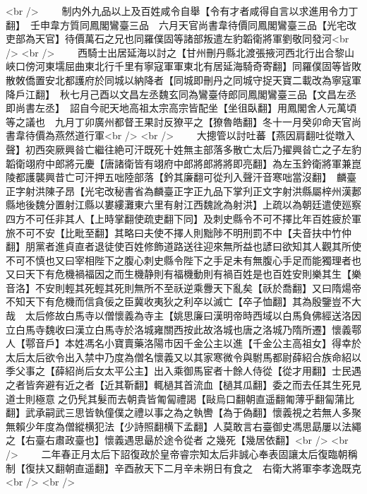 <br />
　　制内外九品以上及百姓咸令自舉【令有才者咸得自言以求進用令力丁翻】　壬申韋方質同鳳閣鸞臺三品　六月天官尚書韋待價同鳳閣鸞臺三品【光宅改吏部為天官】待價萬石之兄也同羅僕固等諸部叛遣左豹韜衛將軍劉敬同發河<br />
<br />
　　西騎士出居延海以討之【甘州刪丹縣北渡張掖河西北行出合黎山峽口傍河東壖屈曲東北行千里有寧寇軍軍東北有居延海騎奇寄翻】同羅僕固等皆敗散敇僑置安北都護府於同城以納降者【同城即刪丹之同城守捉天寶二載改為寧寇軍降戶江翻】　秋七月己酉以文昌左丞魏玄同為鸞臺侍郎同鳳閣鸞臺三品【文昌左丞即尚書左丞】　詔自今祀天地高祖太宗高宗皆配坐【坐徂臥翻】用鳳閣舍人元萬頃等之議也　九月丁卯廣州都督王果討反獠平之【獠魯皓翻】冬十一月癸卯命天官尚書韋待價為燕然道行軍<br />
<br />
　　大摠管以討吐蕃【燕因肩翻吐從暾入聲】初西突厥興㫺亡繼往絶可汗既死十姓無主部落多散亡太后乃擢興㫺亡之子左豹韜衛翊府中郎將元慶【唐諸衛皆有翊府中郎將郎將將即亮翻】為左玉鈐衛將軍兼崑陵都護襲興昔亡可汗押五咄陸部落【鈐其廉翻可從刋入聲汗音寒咄當沒翻】　麟臺正字射洪陳子昂【光宅改秘書省為麟臺正字正九品下掌刋正文字射洪縣屬梓州漢郪縣地後魏分置射江縣以婁縷灘東六里有射江西魏訛為射洪】上疏以為朝廷遣使廵察四方不可任非其人【上時掌翻使疏吏翻下同】及刺史縣令不可不擇比年百姓疲於軍旅不可不安【比毗至翻】其略曰夫使不擇人則黜陟不明刑罰不中【夫音扶中竹仲翻】朋黨者進貞直者退徒使百姓修飾道路送往迎來無所益也諺曰欲知其人觀其所使不可不慎也又曰宰相陛下之腹心刺史縣令陛下之手足未有無腹心手足而能獨理者也又曰天下有危機禍福因之而生機静則有福機動則有禍百姓是也百姓安則樂其生【樂音洛】不安則輕其死輕其死則無所不至祅逆乘釁天下亂矣【祅於喬翻】又曰隋煬帝不知天下有危機而信貪佞之臣冀收夷狄之利卒以滅亡【卒子恤翻】其為殷鑒豈不大哉　太后修故白馬寺以僧懷義為寺主【姚思廉曰漢明帝時西域以白馬負佛經送洛因立白馬寺魏收曰漢立白馬寺於洛城雍關西按此故洛城也唐之洛城乃隋所遷】懷義鄠人【鄠音戶】本姓馮名小寶賣藥洛陽市因千金公主以進【千金公主高祖女】得幸於太后太后欲令出入禁中乃度為僧名懷義又以其家寒微令與駙馬都尉薛紹合族命紹以季父事之【薛紹尚后女太平公主】出入乘御馬宦者十餘人侍從【從才用翻】士民遇之者皆奔避有近之者【近其靳翻】輒檛其首流血【檛其瓜翻】委之而去任其生死見道士則極意之仍髠其髮而去朝貴皆匍匐禮謁【敺烏口翻朝直遥翻匍薄乎翻匐蒲比翻】武承嗣武三思皆執僮僕之禮以事之為之執轡【為于偽翻】懷義視之若無人多聚無賴少年度為僧縱横犯法【少詩照翻横下孟翻】人莫敢言右臺御史馮思勗屢以法繩之【右臺右肅政臺也】懷義遇思朂於途令從者之幾死【幾居依翻】<br />
<br />
　　二年春正月太后下詔復政於皇帝睿宗知太后非誠心奉表固讓太后復臨朝稱制【復扶又翻朝直遥翻】辛酉赦天下二月辛未朔日有食之　右衛大將軍李孝逸既克<br />
<br />
